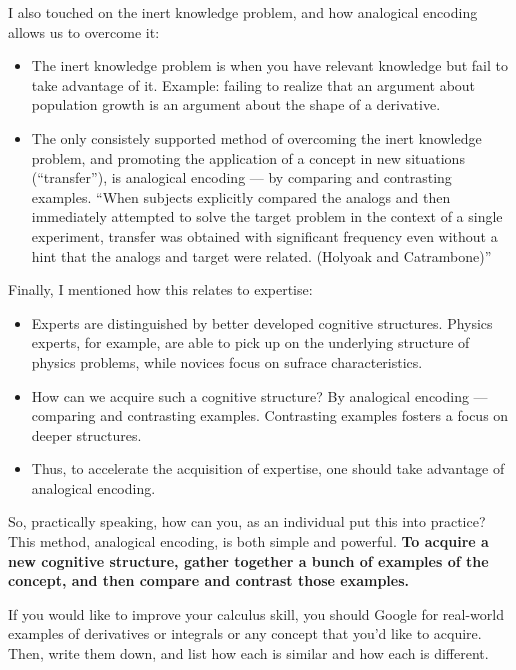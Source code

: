 I also touched on the inert knowledge problem, and how analogical
encoding allows us to overcome it:

\begin{itemize}
\itemsep1pt\parskip0pt
\item
  The inert knowledge problem is when you have relevant knowledge but
  fail to take advantage of it. Example: failing to realize that an
  argument about population growth is an argument about the shape of a
  derivative.
\item
  The only consistely supported method of overcoming the inert knowledge
  problem, and promoting the application of a concept in new situations
  (``transfer''), is analogical encoding --- by comparing and contrasting
  examples. ``When subjects explicitly compared the analogs and then
  immediately attempted to solve the target problem in the context of a
  single experiment, transfer was obtained with significant frequency
  even without a hint that the analogs and target were related. (Holyoak
  and Catrambone)''
\end{itemize}

Finally, I mentioned how this relates to expertise:

\begin{itemize}
\itemsep1pt\parskip0pt
\item
  Experts are distinguished by better developed cognitive structures.
  Physics experts, for example, are able to pick up on the underlying
  structure of physics problems, while novices focus on sufrace
  characteristics.
\item
  How can we acquire such a cognitive structure? By analogical encoding
  --- comparing and contrasting examples. Contrasting examples fosters a
  focus on deeper structures.
\item
  Thus, to accelerate the acquisition of expertise, one should take
  advantage of analogical encoding.
\end{itemize}

So, practically speaking, how can you, as an individual put this into
practice? This method, analogical encoding, is both simple and powerful.
\textbf{To acquire a new cognitive structure, gather together a bunch of
examples of the concept, and then compare and contrast those examples.}

If you would like to improve your calculus skill, you should Google for
real-world examples of derivatives or integrals or any concept that
you'd like to acquire. Then, write them down, and list how each is
similar and how each is different.

